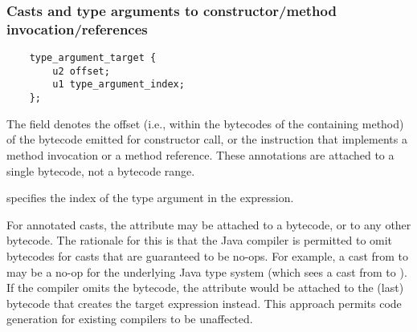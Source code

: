 \documentclass[10pt]{article}
\begin{document}


\subsubsection{Casts and type arguments to constructor/method invocation/references\label{class-file:ext:ri:cast}\label{class-file:ext:ri:con-typearg}\label{class-file:ext:ri:mref-typearg}\label{class-file:ext:ri:cref-typearg}}


\preverbnegspace
\begin{Verbatim}
    type_argument_target {
        u2 offset;
        u1 type_argument_index;
    };
\end{Verbatim}

The  field denotes the offset (i.e., within the bytecodes
of the containing method) of the  bytecode emitted for
constructor call, or the
instruction that implements a
method invocation or a method reference.  These annotations
are attached to a single bytecode, not a bytecode range.

 specifies the index of the type argument in the
expression.


For annotated casts, the attribute may be attached to a
 bytecode, or to any other bytecode.  The rationale for
this is that the Java compiler is permitted to omit 
bytecodes for casts that are guaranteed to be no-ops.  For example, a
cast from  to  may be a no-op for the
underlying Java type system (which sees a cast from  to
).  If the compiler omits the  bytecode, the
 attribute would be attached to the (last) bytecode that
creates the target expression instead.  This approach permits code
generation for existing compilers to be unaffected.
\end{document}
